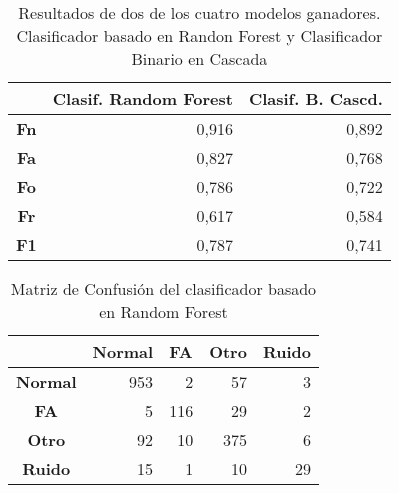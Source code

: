         \begin{table}[H]
        \caption{Resultados de dos de los cuatro modelos ganadores. Clasificador basado en Randon Forest y Clasificador Binario en Cascada}
        \begin{center}
        \begin{tabular}{|c|r|r|}
        \hline
        & \multicolumn{1}{l|}{\textbf{Clasif. Random Forest}} & \multicolumn{1}{l|}{\textbf{Clasif. B. Cascd.}} \\ \hline
        \textbf{Fn} & 0,916 & 0,892 \\ \hline
        \textbf{Fa} & 0,827 & 0,768 \\ \hline
        \textbf{Fo} & 0,786 & 0,722 \\ \hline
        \textbf{Fr} & 0,617 & 0,584 \\ \hline
        \textbf{F1} & 0,787 & 0,741 \\ \hline
        \end{tabular}
        \end{center}
        \label{table:resultados_modelosganadores}
        \end{table}

        \begin{table}[H]
        \caption{Matriz de Confusión del clasificador basado en Random Forest}
        \begin{center}
        \begin{tabular}{|c|r|r|r|r|}
        \hline
        \multicolumn{1}{|l|}{} & \multicolumn{1}{l|}{\textbf{Normal}} & \multicolumn{1}{l|}{\textbf{FA}} & \multicolumn{1}{l|}{\textbf{Otro}} & \multicolumn{1}{l|}{\textbf{Ruido}} \\ \hline
        \textbf{Normal} & 953 & 2 & 57 & 3 \\ \hline
        \textbf{FA} & 5 & 116 & 29 & 2 \\ \hline
        \textbf{Otro} & 92 & 10 & 375 & 6 \\ \hline
        \textbf{Ruido} & 15 & 1 & 10 & 29 \\ \hline
        \end{tabular}
        \end{center}
        \label{table:RF_CM}
        \end{table}


    

